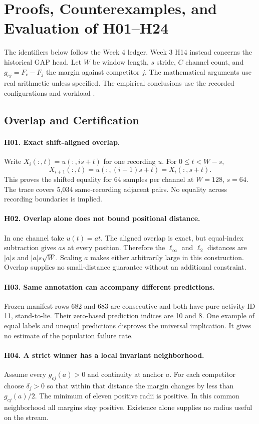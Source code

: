 \section{Proofs, Counterexamples, and Evaluation of H01--H24}
The identifiers below follow the Week 4 ledger. Week 3 H14 instead concerns the historical GAP head. Let $W$ be window length, $s$ stride, $C$ channel count, and $g_{cj}=F_c-F_j$ the margin against competitor $j$. The mathematical arguments use real arithmetic unless specified. The empirical conclusions use the recorded configurations and workload \cite{localw3,localw4,localpaired}.

\subsection{Overlap and Certification}
\paragraph{H01. Exact shift-aligned overlap.}
Write $X_i(:,t)=u(:,is+t)$ for one recording $u$. For $0\le t<W-s$,
\[
X_{i+1}(:,t)=u(:,(i+1)s+t)=X_i(:,s+t).
\]
This proves the shifted equality for 64 samples per channel at $W=128$, $s=64$. The trace covers 5,034 same-recording adjacent pairs. No equality across recording boundaries is implied.

\paragraph{H02. Overlap alone does not bound positional distance.}
In one channel take $u(t)=at$. The aligned overlap is exact, but equal-index subtraction gives $as$ at every position. Therefore the $\ell_\infty$ and $\ell_2$ distances are $|a|s$ and $|a|s\sqrt W$. Scaling $a$ makes either arbitrarily large in this construction. Overlap supplies no small-distance guarantee without an additional constraint.

\paragraph{H03. Same annotation can accompany different predictions.}
Frozen manifest rows 682 and 683 are consecutive and both have pure activity ID 11, stand-to-lie. Their zero-based prediction indices are 10 and 8. One example of equal labels and unequal predictions disproves the universal implication. It gives no estimate of the population failure rate.

\paragraph{H04. A strict winner has a local invariant neighborhood.}
Assume every $g_{cj}(a)>0$ and continuity at anchor $a$. For each competitor choose $\delta_j>0$ so that within that distance the margin changes by less than $g_{cj}(a)/2$. The minimum of eleven positive radii is positive. In this common neighborhood all margins stay positive. Existence alone supplies no radius useful on the stream.

